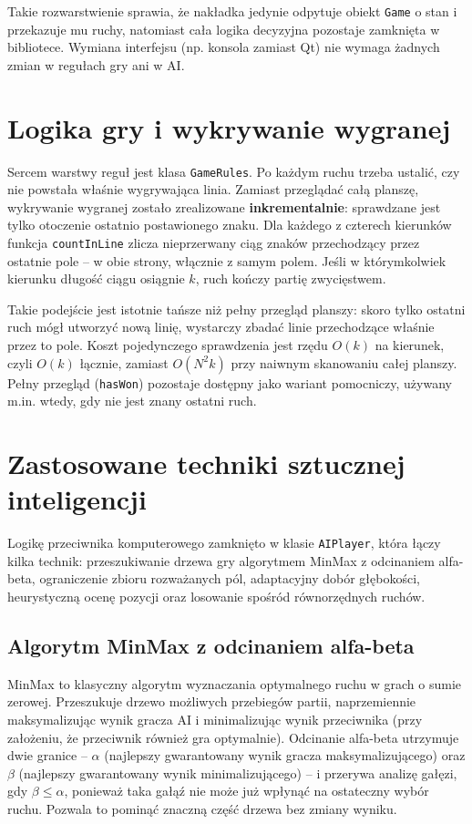 Takie rozwarstwienie sprawia, że nakładka jedynie odpytuje obiekt \texttt{Game} o stan i przekazuje
mu ruchy, natomiast cała logika decyzyjna pozostaje zamknięta w bibliotece. Wymiana interfejsu
(np. konsola zamiast Qt) nie wymaga żadnych zmian w regułach gry ani w AI.


\section{Logika gry i wykrywanie wygranej}

Sercem warstwy reguł jest klasa \texttt{GameRules}. Po każdym ruchu trzeba ustalić, czy nie
powstała właśnie wygrywająca linia. Zamiast przeglądać całą planszę, wykrywanie wygranej zostało
zrealizowane \textbf{inkrementalnie}: sprawdzane jest tylko otoczenie ostatnio postawionego znaku.
Dla każdego z czterech kierunków funkcja \texttt{countInLine} zlicza nieprzerwany ciąg znaków
przechodzący przez ostatnie pole -- w obie strony, włącznie z samym polem. Jeśli w którymkolwiek
kierunku długość ciągu osiągnie $k$, ruch kończy partię zwycięstwem.

Takie podejście jest istotnie tańsze niż pełny przegląd planszy: skoro tylko ostatni ruch mógł
utworzyć nową linię, wystarczy zbadać linie przechodzące właśnie przez to pole. Koszt pojedynczego
sprawdzenia jest rzędu $O(k)$ na kierunek, czyli $O(k)$ łącznie, zamiast $O(N^{2}k)$ przy naiwnym
skanowaniu całej planszy. Pełny przegląd (\texttt{hasWon}) pozostaje dostępny jako wariant
pomocniczy, używany m.in. wtedy, gdy nie jest znany ostatni ruch.


\section{Zastosowane techniki sztucznej inteligencji}

Logikę przeciwnika komputerowego zamknięto w klasie \texttt{AIPlayer}, która łączy kilka technik:
przeszukiwanie drzewa gry algorytmem MinMax z odcinaniem alfa-beta, ograniczenie zbioru
rozważanych pól, adaptacyjny dobór głębokości, heurystyczną ocenę pozycji oraz losowanie spośród
równorzędnych ruchów.

\subsection{Algorytm MinMax z odcinaniem alfa-beta}

MinMax to klasyczny algorytm wyznaczania optymalnego ruchu w grach o sumie zerowej. Przeszukuje
drzewo możliwych przebiegów partii, naprzemiennie maksymalizując wynik gracza AI i minimalizując
wynik przeciwnika (przy założeniu, że przeciwnik również gra optymalnie). Odcinanie alfa-beta
utrzymuje dwie granice -- $\alpha$ (najlepszy gwarantowany wynik gracza maksymalizującego) oraz
$\beta$ (najlepszy gwarantowany wynik minimalizującego) -- i przerywa analizę gałęzi, gdy
$\beta \le \alpha$, ponieważ taka gałąź nie może już wpłynąć na ostateczny wybór ruchu. Pozwala to
pominąć znaczną część drzewa bez zmiany wyniku.

